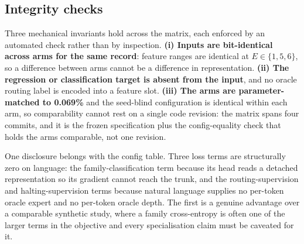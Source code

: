 \subsection{Integrity checks}
\label{sec:integrity}

Three mechanical invariants hold across the matrix, each enforced by an automated
check rather than by inspection. \textbf{(i) Inputs are bit-identical across arms
for the same record}: feature ranges are identical at $E \in \{1,5,6\}$, so a
difference between arms cannot be a difference in representation. \textbf{(ii) The
regression or classification target is absent from the input}, and no oracle routing
label is encoded into a feature slot. \textbf{(iii) The arms are parameter-matched
to 0.069\%} and the seed-blind configuration is identical within each arm, so
comparability cannot rest on a single code revision: the matrix spans four commits,
and it is the frozen specification plus the config-equality check that holds the
arms comparable, not one revision.

One disclosure belongs with the config table. Three loss terms are structurally
zero on language: the family-classification term because its head reads a detached
representation so its gradient cannot reach the trunk, and the routing-supervision
and halting-supervision terms because natural language supplies no per-token oracle
expert and no per-token oracle depth. The first is a genuine advantage over a
comparable synthetic study, where a family cross-entropy is often one of the larger
terms in the objective and every specialisation claim must be caveated for it.
